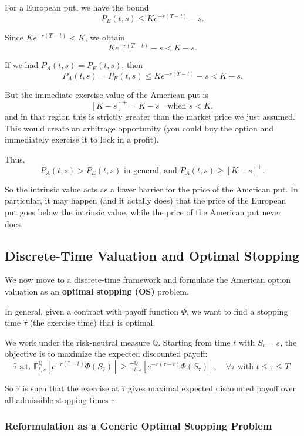 \documentclass[12pt,a4paper]{article}
\theoremstyle{definition}
\begin{document}
For a European put, we have the bound
\[
P_E(t, s) \leq K e^{-r(T-t)} - s.
\]

Since $K e^{-r(T-t)} < K$, we obtain
\[
K e^{-r(T-t)} - s < K - s.
\]

If we had $P_A(t, s) = P_E(t, s)$, then
\[
P_A(t, s) = P_E(t, s) \leq K e^{-r(T-t)} - s < K - s.
\]

But the immediate exercise value of the American put is
\[
[K - s]^+ = K - s \quad \text{when } s < K,
\]
and in that region this is strictly greater than the market price we just assumed. This would create an arbitrage opportunity (you could buy the option and immediately exercise it to lock in a profit).

Thus,
\[
\boxed{P_A(t, s) > P_E(t, s) \text{ in general, and } P_A(t, s) \geq [K - s]^+.}
\]

So the intrinsic value acts as a lower barrier for the price of the American put.
In particular, it may happen (and it actally does) that the price of the European put goes below the intrinsic value, while the price of the American put never does.

\subsection{Discrete-Time Valuation and Optimal Stopping}

We now move to a discrete-time framework and formulate the American option valuation as an \textbf{optimal stopping (OS)} problem.

In general, given a contract with payoff function $\Phi$, we want to find a stopping time $\widehat{\tau}$ (the exercise time) that is optimal.

We work under the risk-neutral measure $\mathbb{Q}$. Starting from time $t$ with $S_t = s$, the objective is to maximize the expected discounted payoff:
\[
\widehat{\tau} \text{ s.t. } \mathbb{E}_{t,s}^{\mathbb{Q}}\left[e^{-r(\widehat{\tau} - t)} \Phi(S_{\widehat{\tau}})\right] \geq \mathbb{E}_{t,s}^{\mathbb{Q}}\left[e^{-r(\tau - t)} \Phi(S_\tau)\right], \quad \forall \tau \text{ with } t \leq \tau \leq T.
\]

So $\widehat{\tau}$ is such that the exercise at $\widehat{\tau}$ gives maximal expected discounted payoff over all admissible stopping times $\tau$.

\subsubsection{Reformulation as a Generic Optimal Stopping Problem}
\end{document}
